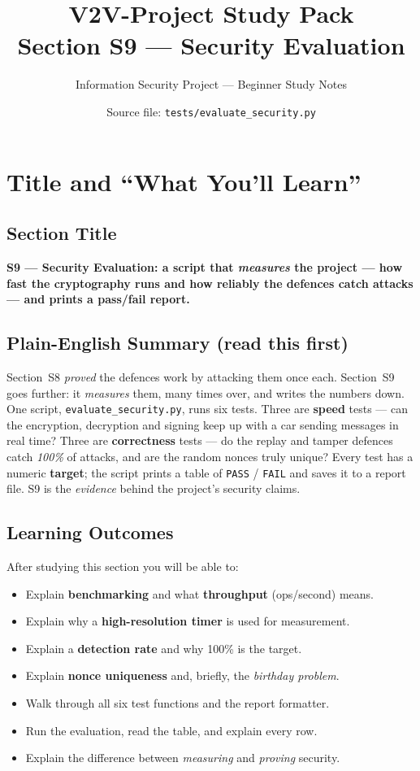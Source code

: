 \documentclass[11pt,a4paper]{article}
\title{\textbf{V2V-Project Study Pack}\\[4pt]
       \large Section S9 --- Security Evaluation}
\author{Information Security Project --- Beginner Study Notes}
\date{Source file: \texttt{tests/evaluate\_security.py}}
\begin{document}
\maketitle
\tableofcontents
\newpage

\section{Title and ``What You'll Learn''}

\subsection*{Section Title}
\textbf{S9 --- Security Evaluation: a script that \emph{measures} the project ---
how fast the cryptography runs and how reliably the defences catch attacks ---
and prints a pass/fail report.}

\subsection*{Plain-English Summary (read this first)}
Section~S8 \emph{proved} the defences work by attacking them once each. Section~S9
goes further: it \emph{measures} them, many times over, and writes the numbers
down. One script, \texttt{evaluate\_security.py}, runs six tests. Three are
\textbf{speed} tests --- can the encryption, decryption and signing keep up with
a car sending messages in real time? Three are \textbf{correctness} tests --- do
the replay and tamper defences catch \emph{100\%} of attacks, and are the random
nonces truly unique? Every test has a numeric \textbf{target}; the script prints
a table of \texttt{PASS} / \texttt{FAIL} and saves it to a report file. S9 is the
\emph{evidence} behind the project's security claims.

\subsection*{Learning Outcomes}
After studying this section you will be able to:
\begin{itemize}
  \item Explain \textbf{benchmarking} and what \textbf{throughput} (ops/second) means.
  \item Explain why a \textbf{high-resolution timer} is used for measurement.
  \item Explain a \textbf{detection rate} and why 100\% is the target.
  \item Explain \textbf{nonce uniqueness} and, briefly, the \emph{birthday problem}.
  \item Walk through all six test functions and the report formatter.
  \item Run the evaluation, read the table, and explain every row.
  \item Explain the difference between \emph{measuring} and \emph{proving} security.
\end{itemize}
\end{document}
